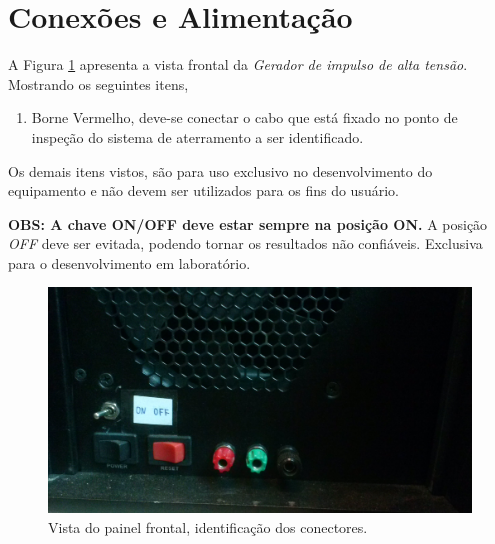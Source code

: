 \documentclass[a4paper, 10pt]{article}
\begin{document}
\section{Conexões e Alimentação}

A Figura \ref{fig_painel_frontal} apresenta a vista frontal da \textit{Gerador de 
impulso de alta tensão}.
Mostrando os seguintes itens, 

\begin{enumerate}
    \item Borne Vermelho, deve-se conectar o cabo que está fixado no 
        ponto de inspeção do sistema de aterramento a ser identificado.
\end{enumerate}

Os demais itens vistos, são para uso exclusivo no desenvolvimento do equipamento e não devem
ser utilizados para os fins do usuário. 

\textbf{OBS: A chave ON/OFF deve estar sempre na posição ON.} A posição \textit{OFF} deve ser 
evitada, podendo tornar os resultados não confiáveis. Exclusiva para o desenvolvimento
em laboratório.

\begin{figure}[!h]
        \caption{\label{fig_painel_frontal} Vista do painel frontal, identificação dos conectores.}
	    \begin{center}
            \includegraphics[scale=0.1]{../fotos/painel_frontal.jpg}
	    \end{center}
\end{figure}

\end{document}
